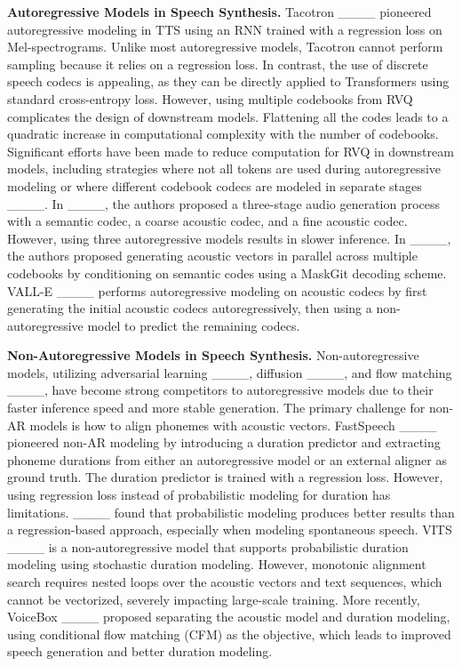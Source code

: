 {\bf Autoregressive Models in Speech Synthesis.} Tacotron ____ pioneered autoregressive modeling in TTS using an RNN trained with a regression loss on Mel-spectrograms. Unlike most autoregressive models, Tacotron cannot perform sampling because it relies on a regression loss. In contrast, the use of discrete speech codecs is appealing, as they can be directly applied to Transformers using standard cross-entropy loss. However, using multiple codebooks from RVQ complicates the design of downstream models. Flattening all the codes leads to a quadratic increase in computational complexity with the number of codebooks. Significant efforts have been made to reduce computation for RVQ in downstream models, including strategies where not all tokens are used during autoregressive modeling or where different codebook codecs are modeled in separate stages ____.
In ____, the authors proposed a three-stage audio generation process with a semantic codec, a coarse acoustic codec, and a fine acoustic codec. However, using three autoregressive models results in slower inference. In ____, the authors proposed generating acoustic vectors in parallel across multiple codebooks by conditioning on semantic codes using a MaskGit decoding scheme. VALL-E ____ performs autoregressive modeling on acoustic codecs by first generating the initial acoustic codecs autoregressively, then using a non-autoregressive model to predict the remaining codecs.

{\bf Non-Autoregressive Models in Speech Synthesis.}
Non-autoregressive models, utilizing adversarial learning ____, diffusion ____, and flow matching ____, have become strong competitors to autoregressive models due to their faster inference speed and more stable generation.
The primary challenge for non-AR models is how to align phonemes with acoustic vectors. FastSpeech ____ pioneered non-AR modeling by introducing a duration predictor and extracting phoneme durations from either an autoregressive model or an external aligner as ground truth. The duration predictor is trained with a regression loss. However, using regression loss instead of probabilistic modeling for duration has limitations. ____ found that probabilistic modeling produces better results than a regression-based approach, especially when modeling spontaneous speech.
VITS ____ is a non-autoregressive model that supports probabilistic duration modeling using stochastic duration modeling. However, monotonic alignment search requires nested loops over the acoustic vectors and text sequences, which cannot be vectorized, severely impacting large-scale training.
More recently, VoiceBox ____ proposed separating the acoustic model and duration modeling, using conditional flow matching (CFM) as the objective, which leads to improved speech generation and better duration modeling.


